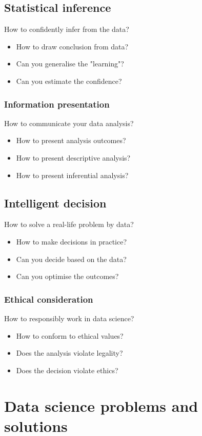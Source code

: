 \documentclass[11pt]{article}
\begin{document}
\subsection{Statistical inference}
\label{sec:org6c88008}
How to confidently infer from the data?
\begin{itemize}
\item How to draw conclusion from data?
\item Can you generalise the "learning"?
\item Can you estimate the confidence?
\end{itemize}
\subsubsection{Information presentation}
\label{sec:orgab00cfb}
How to communicate your data analysis?
\begin{itemize}
\item How to present analysis outcomes?
\item How to present descriptive analysis?
\item How to present inferential analysis?
\end{itemize}
\subsection{Intelligent decision}
\label{sec:orgbde3984}
How to solve a real-life problem by data?
\begin{itemize}
\item How to make decisions in practice?
\item Can you decide based on the data?
\item Can you optimise the outcomes?
\end{itemize}
\subsubsection{Ethical consideration}
\label{sec:orgdb1311c}
How to responsibly work in data science?
\begin{itemize}
\item How to conform to ethical values?
\item Does the analysis violate legality?
\item Does the decision violate ethics?
\end{itemize}

 \newpage
\section{Data science problems and solutions}
\label{sec:org08dcadb}
\end{document}
